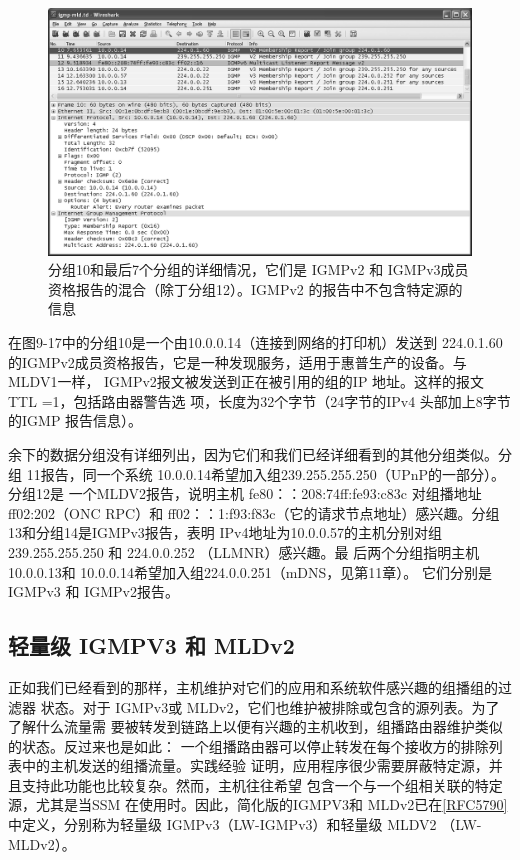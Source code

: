 \begin{figure}[ht]
  \centering
  \includegraphics[width=1.0\textwidth]{imgs/9/9-17.png}
  \caption{分组10和最后7个分组的详细情况，它们是 IGMPv2 和
  IGMPv3成员资格报告的混合（除丁分组12）。IGMPv2 的报告中不包含特定源的信息}
\end{figure}
在图9-17中的分组10是一个由10.0.0.14（连接到网络的打印机）发送到 224.0.1.60
的IGMPv2成员资格报告，它是一种发现服务，适用于惠普生产的设备。与MLDV1一样，
IGMPv2报文被发送到正在被引用的组的IP 地址。这样的报文 TTL =1，包括路由器警告选
项，长度为32个字节（24字节的IPv4 头部加上8字节的IGMP 报告信息）。

余下的数据分组没有详细列出，因为它们和我们已经详细看到的其他分组类似。分组
11报告，同一个系统 10.0.0.14希望加入组239.255.255.250（UPnP的一部分）。分组12是
一个MLDV2报告，说明主机 fe80：：208:74ff:fe93:c83c 对组播地址 ff02:202（ONC RPC）和
ff02：：1:f93:f83c（它的请求节点地址）感兴趣。分组13和分组14是IGMPv3报告，表明
IPv4地址为10.0.0.57的主机分别对组239.255.255.250 和 224.0.0.252 （LLMNR）感兴趣。最
后两个分组指明主机 10.0.0.13和 10.0.0.14希望加入组224.0.0.251（mDNS，见第11章）。
它们分别是 IGMPv3 和 IGMPv2报告。

\subsection{轻量级 IGMPV3 和 MLDv2}
正如我们已经看到的那样，主机维护对它们的应用和系统软件感兴趣的组播组的过滤器
状态。对于 IGMPv3或 MLDv2，它们也维护被排除或包含的源列表。为了了解什么流量需
要被转发到链路上以便有兴趣的主机收到，组播路由器维护类似的状态。反过来也是如此：
一个组播路由器可以停止转发在每个接收方的排除列表中的主机发送的组播流量。实践经验
证明，应用程序很少需要屏蔽特定源，并且支持此功能也比较复杂。然而，主机往往希望
包含一个与一个组相关联的特定源，尤其是当SSM 在使用时。因此，简化版的IGMPV3和
MLDv2已在\href{https://www.rfc-editor.org/rfc/rfc5790}{[RFC5790]}中定义，分别称为轻量级
IGMPv3（LW-IGMPv3）和轻量级 MLDV2
（LW-MLDv2）。

